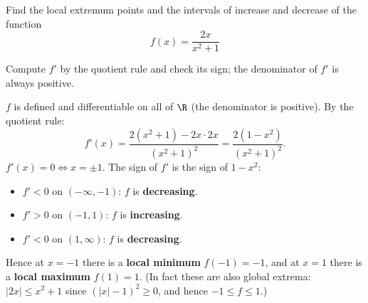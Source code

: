 
\begin{question}
Find the local extremum points and the intervals of increase and decrease of the function
\[ f(x)=\frac{2x}{x^2+1} \]
\end{question}

\begin{hint}
Compute $f'$ by the quotient rule and check its sign; the denominator of $f'$ is always positive.
\end{hint}

\begin{solution}
$f$ is defined and differentiable on all of $\R$ (the denominator is positive). By the quotient rule:
\[ f'(x)=\frac{2(x^2+1)-2x\cdot2x}{(x^2+1)^2}=\frac{2(1-x^2)}{(x^2+1)^2}. \]
$f'(x)=0\iff x=\pm1$. The sign of $f'$ is the sign of $1-x^2$:
\begin{itemize}
  \item $f'<0$ on $(-\infty,-1)$: $f$ is \textbf{decreasing}.
  \item $f'>0$ on $(-1,1)$: $f$ is \textbf{increasing}.
  \item $f'<0$ on $(1,\infty)$: $f$ is \textbf{decreasing}.
\end{itemize}
Hence at $x=-1$ there is a \textbf{local minimum} $f(-1)=-1$, and at $x=1$ there is a \textbf{local maximum} $f(1)=1$.
(In fact these are also global extrema: $|2x|\le x^2+1$ since $(|x|-1)^2\ge0$, and hence $-1\le f\le 1$.)
\end{solution}
